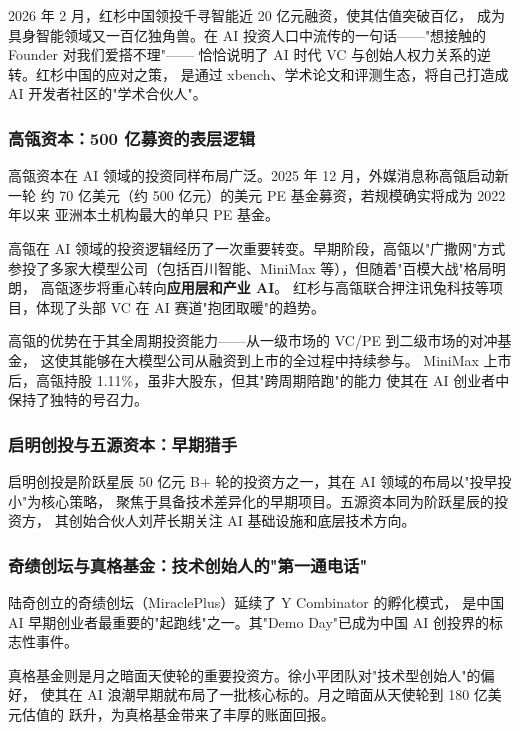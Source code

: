 2026 年 2 月，红杉中国领投千寻智能近 20 亿元融资，使其估值突破百亿，
成为具身智能领域又一百亿独角兽。在 AI 投资人口中流传的一句话——"想接触的 Founder 对我们爱搭不理"——
恰恰说明了 AI 时代 VC 与创始人权力关系的逆转。红杉中国的应对之策，
是通过 xbench、学术论文和评测生态，将自己打造成 AI 开发者社区的"学术合伙人"。

\subsubsection{高瓴资本：500 亿募资的表层逻辑}

高瓴资本在 AI 领域的投资同样布局广泛。2025 年 12 月，外媒消息称高瓴启动新一轮
约 70 亿美元（约 500 亿元）的美元 PE 基金募资，若规模确实将成为 2022 年以来
亚洲本土机构最大的单只 PE 基金。

高瓴在 AI 领域的投资逻辑经历了一次重要转变。早期阶段，高瓴以"广撒网"方式
参投了多家大模型公司（包括百川智能、MiniMax 等），但随着"百模大战"格局明朗，
高瓴逐步将重心转向\textbf{应用层和产业 AI}。
红杉与高瓴联合押注讯兔科技等项目，体现了头部 VC 在 AI 赛道"抱团取暖"的趋势。

高瓴的优势在于其全周期投资能力——从一级市场的 VC/PE 到二级市场的对冲基金，
这使其能够在大模型公司从融资到上市的全过程中持续参与。
MiniMax 上市后，高瓴持股 1.11\%，虽非大股东，但其"跨周期陪跑"的能力
使其在 AI 创业者中保持了独特的号召力。

\subsubsection{启明创投与五源资本：早期猎手}

启明创投是阶跃星辰 50 亿元 B+ 轮的投资方之一，其在 AI 领域的布局以"投早投小"为核心策略，
聚焦于具备技术差异化的早期项目。五源资本同为阶跃星辰的投资方，
其创始合伙人刘芹长期关注 AI 基础设施和底层技术方向。

\subsubsection{奇绩创坛与真格基金：技术创始人的"第一通电话"}

陆奇创立的奇绩创坛（MiraclePlus）延续了 Y Combinator 的孵化模式，
是中国 AI 早期创业者最重要的"起跑线"之一。其"Demo Day"已成为中国 AI 创投界的标志性事件。

真格基金则是月之暗面天使轮的重要投资方。徐小平团队对"技术型创始人"的偏好，
使其在 AI 浪潮早期就布局了一批核心标的。月之暗面从天使轮到 180 亿美元估值的
跃升，为真格基金带来了丰厚的账面回报。

